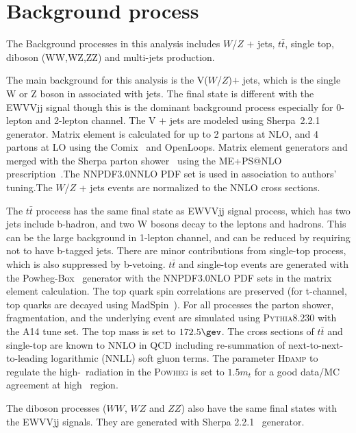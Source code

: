 \section{Background process}
The Background processes in this analysis includes  $W$/$Z$ $\plus$ jets, $t\bar{t}$, single top, diboson (WW,WZ,ZZ) and multi-jets production. 

The main background for this analysis is the V($W$/$Z$)$\plus$ jets, which is the single W or Z boson in associated with jets. The final state is different with the EWVVjj signal though this is the dominant background process especially for 0-lepton and 2-lepton channel.
The V $\plus$ jets are modeled using Sherpa~2.2.1~\cite{Gleisberg:2008ta} generator. 
Matrix element is calculated for up to 2 partons at NLO, and 4 partons at LO using the Comix~\cite{Gleisberg:2008fv} and OpenLoops\cite{Cascioli:2011va}. Matrix element generators and merged with the Sherpa parton shower~\cite{Schumann:2007mg} using the ME+PS@NLO prescription~\cite{Hoeche:2012yf}.The NNPDF3.0NNLO PDF set is used in association to authors' tuning.The $W$/$Z$ + jets events are normalized to the NNLO cross sections.

The $t\bar{t}$ proceess has the same final state as EWVVjj signal process, which has two jets include b-hadron, and two W bosons decay to the leptons and hadrons. This can be the large background in 1-lepton channel, and can be reduced by requiring not to have b-tagged jets. There are minor contributions from single-top process, which is also suppressed by b-vetoing.
$t\bar{t}$ and single-top events are generated with the Powheg-Box~\cite{Alioli:2010xd} generator with the NNPDF3.0NLO PDF\cite{Ball:2014uwa} sets in the matrix element calculation.
The top quark spin correlations are preserved (for t-channel, top quarks are decayed using MadSpin~\cite{Artoisenet:2012st}). For all processes the parton shower, fragmentation, and the underlying event are simulated using \textsc{Pythia}8.230 with the A14 tune set\cite{ATL-PHYS-PUB-2014-021}. The top mass is set to $172.5\gev$. The cross sections of $t\bar{t}$ and single-top are known to NNLO in QCD including re-summation of next-to-next-to-leading logarithmic (NNLL) soft gluon terms\cite{Czakon:2011xx,Kidonakis:2011wy,Kidonakis:2010tc,Kidonakis:2010ux}.
The parameter \textsc{Hdamp} to regulate the high-\pt\ radiation in the \textsc{Powheg} is set to $1.5m_{t}$ for a good data/MC agreement at high \pt\ region\cite{ATL-PHYS-PUB-2016-020}.

The diboson processes ($WW$, $WZ$ and $ZZ$) also have the same final states with the EWVVjj signals. They are generated with Sherpa 2.2.1~\cite{Gleisberg:2008ta} generator.

